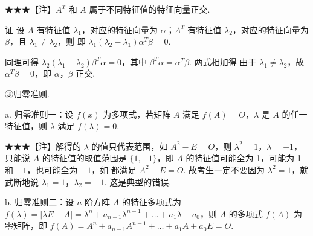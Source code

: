 \begin{fnote}
★★★【注】$A^{T}$ 和 $A$ 属于不同特征值的特征向量正交.

证 设 $A$ 有特征值 $\lambda_1$，对应的特征向量为 $\alpha$；$A^{T}$ 有特征值 $\lambda_2$，对应的特征向量为 $\beta$，且 $\lambda_1\ne\lambda_2$，则
即 $\lambda_1(\lambda_2-\lambda_1)\alpha^{T}\beta=0$.

同理可得 $\lambda_2(\lambda_1-\lambda_2)\beta^{T}\alpha=0$，其中 $\beta^{T}\alpha=\alpha^{T}\beta$. 两式相加得
由于 $\lambda_1\ne\lambda_2$，故 $\alpha^{T}\beta=0$，即 $\alpha$，$\beta$ 正交.
\end{fnote}


③归零准则.

a. 归零准则一：设 $f(x)$ 为多项式，若矩阵 $A$ 满足 $f(A)=O$，$\lambda$ 是 $A$ 的任一特征值，则 $\lambda$ 满足 $f(\lambda)=0$.

\begin{fnote}
★★★【注】解得的 $\lambda$ 的值只代表范围，如 $A^{2}-E=O$，则 $\lambda^{2}=1$，$\lambda=\pm1$，只能说 $A$ 的特征值的取值范围是 $\{1,-1\}$，即 $A$ 的特征值可能全为 1，可能为 1 和 $-1$，也可能全为 $-1$，如
都满足 $A^{2}-E=O$. 故考生一定不要因为 $\lambda^{2}=1$，就武断地说 $\lambda_1=1$，$\lambda_2=-1$. 这是典型的错误.
\end{fnote}

b. 归零准则二：设 $n$ 阶方阵 $A$ 的特征多项式为 $f(\lambda)=|\lambda E-A|=\lambda^{n}+a_{n-1}\lambda^{n-1}+\dots+a_1\lambda+a_0$，则 $A$ 的多项式 $f(A)$ 为零矩阵，即 $f(A)=A^{n}+a_{n-1}A^{n-1}+\dots+a_1A+a_0E=O$.

